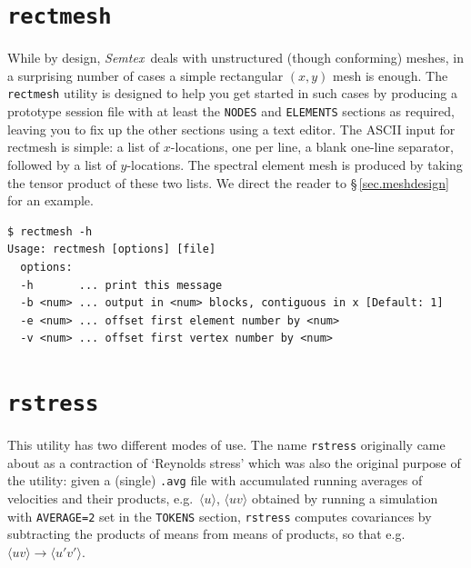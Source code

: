 \documentclass[11pt]{report}
\newcommand{\Semtex}{\emph{Semtex}} \newcommand{\Dog}{\emph{Dog}}
\newcommand{\eg}{e.g.\ } \newcommand{\CC}{\mathrm{c.c.}}
\begin{document}
\section{\texttt{rectmesh}}
\label{sec.rectmesh}

While by design, \Semtex\ deals with unstructured (though conforming)
meshes, in a surprising number of cases a simple rectangular $(x,y)$
mesh is enough.  The \verb|rectmesh| utility is designed to help you get
started in such cases by producing a prototype session file with at
least the \verb|NODES| and \verb|ELEMENTS| sections as required,
leaving you to fix up the other sections using a text editor.  The
ASCII input for rectmesh is simple: a list of $x$-locations, one per
line, a blank one-line separator, followed by a list of $y$-locations.
The spectral element mesh is produced by taking the tensor product of
these two lists.  We direct the reader to \S\,\ref{sec.meshdesign} for
an example.

{\small
\begin{verbatim}
$ rectmesh -h
Usage: rectmesh [options] [file]
  options:
  -h       ... print this message
  -b <num> ... output in <num> blocks, contiguous in x [Default: 1]
  -e <num> ... offset first element number by <num>
  -v <num> ... offset first vertex number by <num>
\end{verbatim}
}
%


%

\section{\texttt{rstress}}
\label{sec.rstress}

This utility has two different modes of use.  The name \verb|rstress|
originally came about as a contraction of `Reynolds stress' which was
also the original purpose of the utility: given a (single) \verb|.avg|
file with accumulated running averages of velocities and their
products, \eg $\langle u\rangle$, $\langle uv\rangle$ obtained by
running a simulation with \verb|AVERAGE=2| set in the \verb|TOKENS|
section, \verb|rstress| computes covariances by subtracting the
products of means from means of products, so that \eg $\langle
uv\rangle\to\langle u'v'\rangle$.
\end{document}
